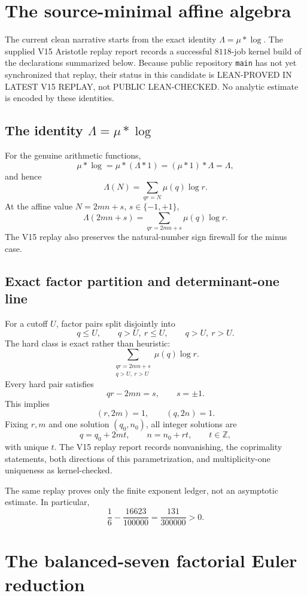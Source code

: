 \documentclass[11pt]{article}
\theoremstyle{definition}
\newcommand{\1}{\mathbf 1}
\newcommand{\status}[1]{\textsf{#1}}
\begin{document}
\section{The source-minimal affine algebra}

The current clean narrative starts from the exact identity $\Lambda=\mu*\log$.  The supplied
V15 Aristotle replay report records a successful $8118$-job kernel build of the declarations
summarized below.  Because public repository \texttt{main} has not yet synchronized that replay,
their status in this candidate is \status{LEAN-PROVED IN LATEST V15 REPLAY}, not
\status{PUBLIC LEAN-CHECKED}.  No analytic estimate is encoded by these identities.

\subsection{The identity $\Lambda=\mu*\log$}

For the genuine arithmetic functions,
\[
\mu*\log=\mu*(\Lambda*1)=(\mu*1)*\Lambda=\Lambda,
\]
and hence
\[
\boxed{\Lambda(N)=\sum_{qr=N}\mu(q)\log r.}
\]
At the affine value $N=2mn+s$, $s\in\{-1,+1\}$,
\[
\boxed{\Lambda(2mn+s)=\sum_{qr=2mn+s}\mu(q)\log r.}
\]
The V15 replay also preserves the natural-number sign firewall for the minus case.

\subsection{Exact factor partition and determinant-one line}

For a cutoff $U$, factor pairs split disjointly into
\[
q\le U,\qquad q>U,\ r\le U,\qquad q>U,\ r>U.
\]
The hard class is exact rather than heuristic:
\[
\sum_{\substack{qr=2mn+s\\q>U,\ r>U}}\mu(q)\log r.
\]
Every hard pair satisfies
\[
qr-2mn=s,\qquad s=\pm1.
\]
This implies
\[
(r,2m)=1,\qquad(q,2n)=1.
\]
Fixing $r,m$ and one solution $(q_0,n_0)$, all integer solutions are
\[
\boxed{q=q_0+2mt,\qquad n=n_0+rt,\qquad t\in\mathbb Z,}
\]
with unique $t$.  The V15 replay report records nonvanishing, the coprimality statements,
both directions of this parametrization, and multiplicity-one uniqueness as kernel-checked.

The same replay proves only the finite exponent ledger, not an asymptotic estimate.  In
particular,
\[
\frac16-\frac{16623}{100000}=\frac{131}{300000}>0.
\]

\section{The balanced-seven factorial Euler reduction}
\end{document}
